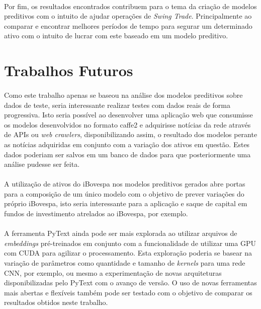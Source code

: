 \documentclass[grad,numbers]{coppe}
\begin{document}
  		\paragraph{}Por fim, os resultados encontrados contribuem para o tema da criação de modelos preditivos com o intuito de ajudar operações de \textit{Swing Trade}. Principalmente ao comparar e encontrar melhores períodos de tempo para segurar um determinado ativo com o intuito de lucrar com este baseado em um modelo preditivo.
 		\section{Trabalhos Futuros}
 			\paragraph{}Como este trabalho apenas se baseou na análise dos modelos preditivos sobre dados de teste, seria interessante realizar testes com dados reais de forma progressiva. Isto seria possível ao desenvolver uma aplicação web que consumisse os modelos desenvolvidos no formato caffe2 e adquirisse notícias da rede através de APIs ou \textit{web crawlers}, disponibilizando assim, o resultado dos modelos perante as notícias adquiridas em conjunto com a variação dos ativos em questão. Estes dados poderiam ser salvos em um banco de dados para que posteriormente uma análise pudesse ser feita.
 			\paragraph{}A utilização de ativos do iBovespa nos modelos preditivos gerados abre portas para a composição de um único modelo com o objetivo de prever variações do próprio iBovespa, isto seria interessante para a aplicação e saque de capital em fundos de investimento atrelados ao iBovespa, por exemplo.
 			\paragraph{}A ferramenta PyText ainda pode ser mais explorada ao utilizar arquivos de \textit{embeddings} pré-treinados em conjunto com a funcionalidade de utilizar uma GPU com CUDA para agilizar o processamento. Esta exploração poderia se basear na variação de parâmetros como quantidade e tamanho de \textit{kernels} para uma rede CNN, por exemplo, ou mesmo a experimentação de novas arquiteturas disponibilizadas pelo PyText com o avanço de versão. O uso de novas ferramentas mais abertas e flexíveis também pode ser testado com o objetivo de comparar os resultados obtidos neste trabalho.
\end{document}

